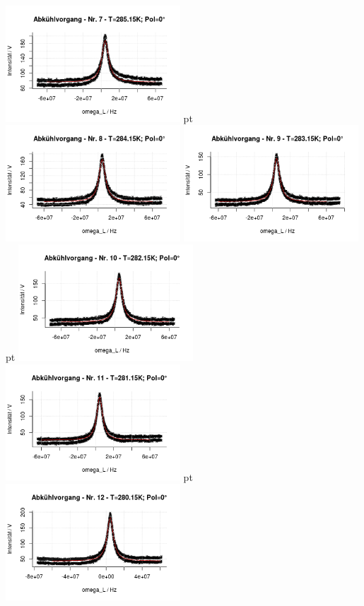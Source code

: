 \documentclass[12pt]{article}
\begin{document}
\begin{minipage}[h!]{\textwidth}
	\centering
	\includegraphics[width=0.49\textwidth]{figures/cold0-7.png} pt
	\includegraphics[width=0.49\textwidth]{figures/cold0-8.png}\vskip -10pt		
		\includegraphics[width=0.49\textwidth]{figures/cold0-9.png} pt
		\includegraphics[width=0.49\textwidth]{figures/cold0-10.png}\vskip -10pt
		\includegraphics[width=0.49\textwidth]{figures/cold0-11.png} pt
		\includegraphics[width=0.49\textwidth]{figures/cold0-12.png}\vskip -10pt	
\end{minipage}
\end{document}
